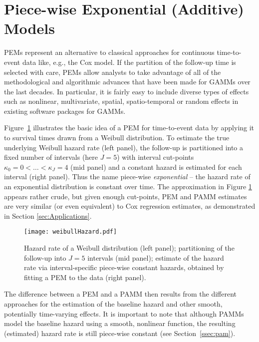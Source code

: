 \documentclass[submit]{smj}
\begin{document}
\section{Piece-wise Exponential (Additive) Models}\label{ssec:pem}

PEMs represent an alternative to classical approaches for continuous time-to-event data like, e.g., the Cox model. If the partition of the follow-up time is selected with care, PEMs allow analysts to take advantage of all of the methodological and algorithmic advances that have been made for GAMMs over the last decades.
In particular, it is fairly easy to include diverse types of effects such as nonlinear, multivariate, spatial, spatio-temporal or random effects in existing software packages for GAMMs.

Figure~\ref{fig:weibullExample} illustrates the basic idea of a PEM for
time-to-event data by applying it to survival times drawn from a Weibull distribution.
To estimate the true underlying Weibull hazard rate (left panel), the
follow-up is partitioned into a fixed number of intervals (here $J=5$) with
interval cut-points $\kappa_0=0 < \ldots < \kappa_{J}=4$ (mid panel) and
a constant hazard is estimated for each interval (right panel). Thus the name
piece-wise \emph{exponential} -- the hazard rate of an exponential
distribution is constant over time.
The approximation in Figure \ref{fig:weibullExample} appears rather crude,
but given enough cut-points, PEM and PAMM estimates are
very similar (or even equivalent) to Cox regression estimates, as demonstrated
in Section \ref{sec:Applications}.

\begin{figure}[!hb]
\texttt{[image: weibullHazard.pdf]}
\caption{Hazard rate of a Weibull distribution (left panel);
partitioning of the follow-up into $J=5$ intervals (mid panel);
estimate of the hazard rate via interval-specific piece-wise constant
hazards, obtained by fitting a PEM to the data (right panel).}
\label{fig:weibullExample}
\end{figure}
The difference
between a PEM and a PAMM then results from the different approaches for the
estimation of the baseline hazard and other smooth, potentially time-varying effects.
It is important to note that although PAMMs model
the baseline hazard using a smooth, nonlinear function, the resulting (estimated)
hazard rate is still piece-wise constant (see Section~\ref{ssec:pam}).
\end{document}
